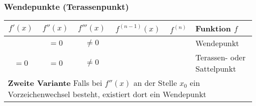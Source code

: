 \subsubsection{Wendepunkte (Terassenpunkt)}
\begin{tabular}{|c|c|c|c|c|l|}
	\hline $f'(x)$ & $f''(x)$ & $f'''(x)$ & $f^{(n-1)}(x)$ & $f^{(n)}$ & Funktion $f$ \\
	\hline\ & $= 0$ & $\neq 0$ & & & Wendepunkt\\
	\hline $= 0$ & $= 0$ & $\neq 0$ & & & Terassen- oder Sattelpunkt\\
	\hline\multicolumn{6}{|l|}{\textbf{Zweite Variante}  Falls bei $f''(x)$ an der Stelle $x_0$ ein Vorzeichenwechsel besteht, existiert dort ein Wendepunkt} \\\hline
\end{tabular}
